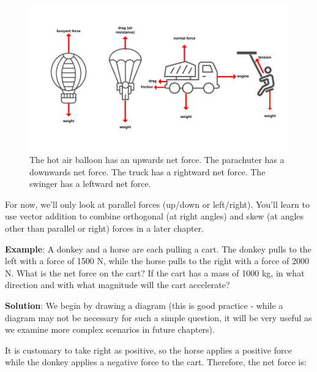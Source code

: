 \begin{figure}
\includegraphics[width=6in]{net_forces.png}
\caption{The hot air balloon has an upwards net force. The parachuter has a 
downwards net force. The truck has a rightward net force. The swinger has a 
leftward net force.}
\label{fig:net_forces}
\end{figure}

For now, we'll only look at parallel forces (up/down or left/right). You'll learn 
to use vector addition to combine orthogonal (at right angles) and skew (at angles
other than parallel or right) forces in a later chapter. 

\textbf{Example}: A donkey and a horse are each pulling a cart. The donkey pulls 
to the left with a force of 1500 N, while the horse pulls to the right with a 
force of 2000 N. What is the net force on the cart? If the cart has a mass of 
1000 kg, in what direction and with what magnitude will the cart accelerate?

\textbf{Solution}: We begin by drawing a diagram (this is good practice - while 
a diagram may not be necessary for such a simple question, it will be very useful 
as we examine more complex scenarios in future chapters). 

\begin{center}
\end{center}

It is customary to take right as positive, so the horse applies a positive force 
while the donkey applies a negative force to the cart. Therefore, the net force 
is:

